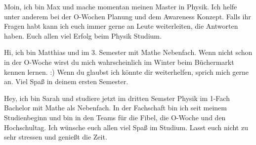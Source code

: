\begin{multicols}{2}
{
Moin, ich bin Max und mache momentan meinen Master in Physik. Ich helfe unter anderem bei der O-Wochen Planung und dem Awareness Konzept. Falls ihr Fragen habt kann ich euch immer gerne an Leute weiterleiten, die Antworten haben. Euch allen viel Erfolg beim Physik Studium. 
}


{
Hi, ich bin Matthias und im 3. Semester mit Mathe Nebenfach. Wenn nicht schon in der O-Woche wirst du mich wahrscheinlich  im Winter beim Büchermarkt kennen lernen. :) 
Wenn du glaubst ich könnte dir weiterhelfen, sprich mich gerne an. Viel Spaß in deinem ersten Semester.  
}

{
Hey, ich bin Sarah und studiere jetzt im dritten Semster Physik im 1-Fach Bachelor mit Mathe als Nebenfach. In der Fachschaft bin ich seit meinem Studienbeginn und bin in den Teams für die Fibel, die O-Woche und den Hochschultag. 
Ich wünsche euch allen viel Spaß im Studium. Lasst euch nicht zu sehr stressen und genießt die Zeit.  
}


\end{multicols}
